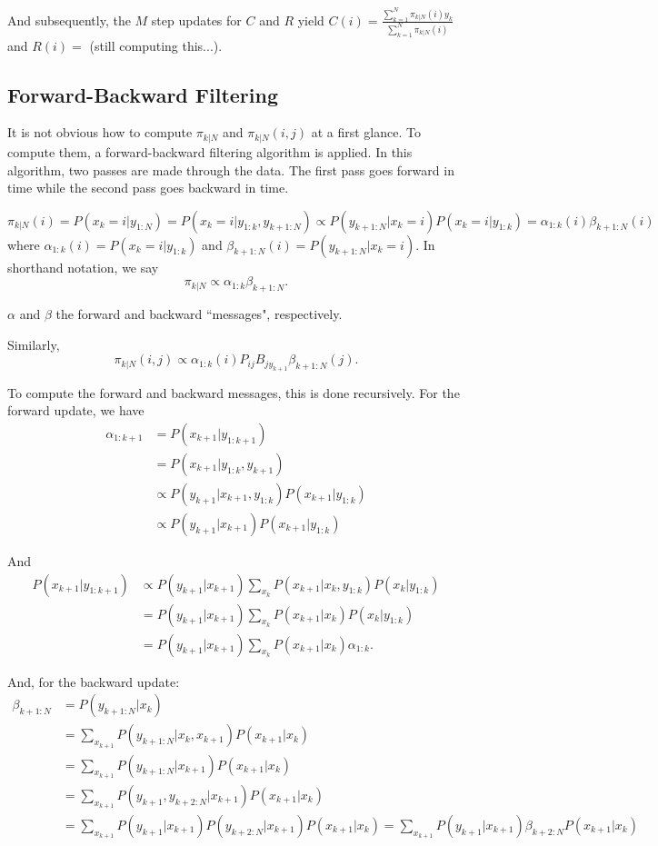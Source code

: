 \documentclass[english]{article}
\numberwithin{equation}{section}
\begin{document}
	And subsequently, the $M$ step updates for $C$ and $R$ yield
	$C(i) = \frac{\sum_{k=1}^N \pi_{k|N}(i)y_k}{\sum_{k=1}^N \pi_{k|N}(i)}$ and $R(i)=$ (still computing this...).
	
	\subsection*{Forward-Backward Filtering}
	
	It is not obvious how to compute $\pi_{k|N}$ and $\pi_{k|N}(i,j)$ at a first glance. To compute them, a forward-backward filtering algorithm is applied. In this algorithm, two passes are made through the data. The first pass goes forward in time while the second pass goes backward in time.
	
	$$\pi_{k|N}(i)=P(x_k=i|y_{1:N})=P(x_k=i|y_{1:k},y_{k+1:N})\propto P(y_{k+1:N}|x_k=i)P(x_k=i|y_{1:k})=\alpha_{1:k}(i)\beta_{k+1:N}(i)$$ where $\alpha_{1:k}(i) = P(x_k=i|y_{1:k})$ and $\beta_{k+1:N}(i)=P(y_{k+1:N}|x_k=i)$. In shorthand notation, we say $$\pi_{k|N}\propto \alpha_{1:k}\beta_{k+1:N}.$$
	
	$\alpha$ and $\beta$ the forward and backward ``messages", respectively.
	
	Similarly, $$\pi_{k|N}(i,j)\propto \alpha_{1:k}(i)P_{ij}B_{jy_{k+1}}\beta_{k+1:N}(j).$$
	
	To compute the forward and backward messages, this is done recursively. For the forward update, we have
	\begin{align*}
	\alpha_{1:k+1} &=P(x_{k+1}|y_{1:k+1}) \\
	&=P(x_{k+1}|y_{1:k},y_{k+1}) \\
	&\propto P(y_{k+1}|x_{k+1},y_{1:k})P(x_{k+1}|y_{1:k}) \\
	&\propto P(y_{k+1}|x_{k+1}) P(x_{k+1}|y_{1:k}) 
	\end{align*}
	
	And \begin{align*}
	P(x_{k+1}|y_{1:k+1}) &\propto P(y_{k+1}|x_{k+1})\sum_{x_k} P(x_{k+1}|x_k,y_{1:k})P(x_k|y_{1:k}) \\
	&= P(y_{k+1}|x_{k+1})\sum_{x_k} P(x_{k+1}|x_k)P(x_k|y_{1:k}) \\
	&= P(y_{k+1}|x_{k+1})\sum_{x_k} P(x_{k+1}|x_k)\alpha_{1:k}.
	\end{align*}
	
	And, for the backward update:
	\begin{align*}
	\beta_{k+1:N} &=P(y_{k+1:N}|x_k) \\
	&=\sum_{x_{k+1}}P(y_{k+1:N}|x_k,x_{k+1})P(x_{k+1}|x_k) \\
	&= \sum_{x_{k+1}}P(y_{k+1:N}|x_{k+1})P(x_{k+1}|x_k) \\
	&= \sum_{x_{k+1}}P(y_{k+1},y_{k+2:N}|x_{k+1})P(x_{k+1}|x_k) \\
	&= \sum_{x_{k+1}}P(y_{k+1}|x_{k+1})P(y_{k+2:N}|x_{k+1})P(x_{k+1}|x_k) = \sum_{x_{k+1}} P(y_{k+1}|x_{k+1})\beta_{k+2:N}P(x_{k+1}|x_k)
	\end{align*}
	
\end{document}
